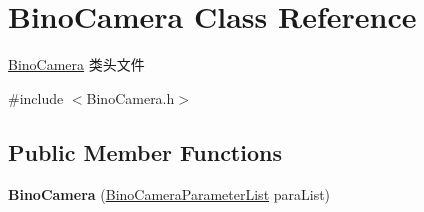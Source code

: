 \hypertarget{classBinoCamera}{}\section{Bino\+Camera Class Reference}
\label{classBinoCamera}


\hyperlink{classBinoCamera}{Bino\+Camera} 类头文件  




{\ttfamily \#include $<$Bino\+Camera.\+h$>$}

\subsection*{Public Member Functions}
\begin{DoxyCompactItemize}
\item 
{\bfseries Bino\+Camera} (\hyperlink{structBinoCameraParameterList}{Bino\+Camera\+Parameter\+List} para\+List)\hypertarget{classBinoCamera_a6fd6ce57220e1d4bd1dcfa2a72d7014c}{}\label{classBinoCamera_a6fd6ce57220e1d4bd1dcfa2a72d7014c}


\end{DoxyCompactItemize}
